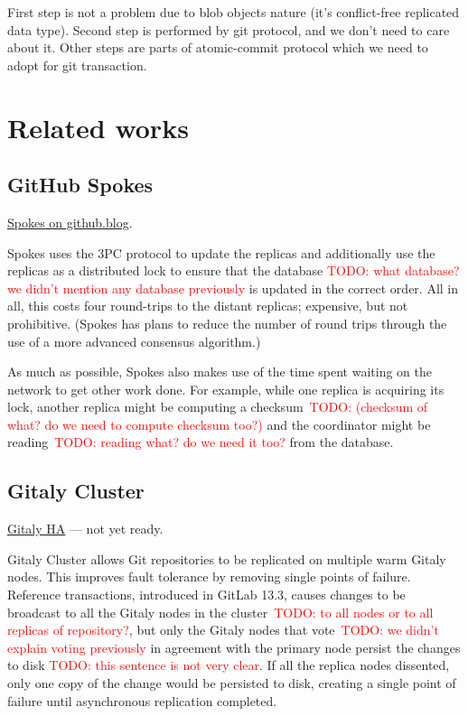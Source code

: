 \documentclass[sigplan, screen, nonacm, 11pt]{acmart}
\newcommand{\todo}[1]{\textcolor{red}{TODO: #1}}
\begin{document}
First step is not a problem due to blob objects nature (it's conflict-free replicated data type).
Second step is performed by git protocol, and we don't need to care about it.
Other steps are parts of atomic-commit protocol which we need to adopt for git transaction.

\section{Related works}

\subsection{GitHub Spokes}

\href{https://github.blog/2017-10-13-stretching-spokes/}{Spokes on github.blog}.

Spokes uses the 3PC protocol to update the replicas and additionally use the replicas as a distributed lock
to ensure that the database \todo{what database? we didn't mention any database previously} is updated in the correct order.
All in all, this costs four round-trips to the distant replicas;
expensive, but not prohibitive.
(Spokes has plans to reduce the number of round trips through the use of a more advanced consensus algorithm.)

As much as possible, Spokes also makes use of the time spent waiting on the network to get other work done.
For example, while one replica is acquiring its lock,
another replica might be computing a checksum~\todo{(checksum of what? do we need to compute checksum too?)}
and the coordinator might be reading~\todo{reading what? do we need it too?} from the database.


\subsection{Gitaly Cluster}

\href{https://gitlab.com/groups/gitlab-org/-/epics/1189}{Gitaly HA} --- not yet ready.

Gitaly Cluster allows Git repositories to be replicated on multiple warm Gitaly nodes.
This improves fault tolerance by removing single points of failure.
Reference transactions, introduced in GitLab 13.3,
causes changes to be broadcast to all the Gitaly nodes in the cluster~\todo{to all nodes or to all replicas of repository?},
but only the Gitaly nodes that vote~\todo{we didn't explain voting previously} in agreement with the primary node persist the changes to disk \todo{this sentence is not very clear}.
If all the replica nodes dissented, only one copy of the change would be persisted to disk,
creating a single point of failure until asynchronous replication completed.
\end{document}
